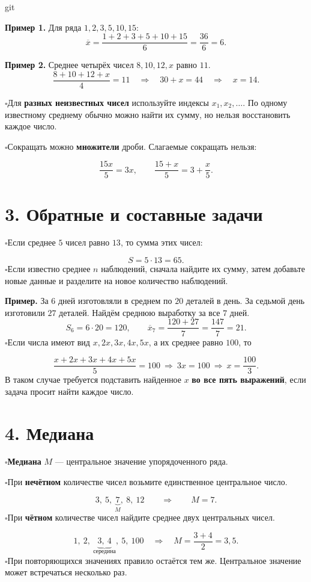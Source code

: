 git\documentclass[a4paper,12pt]{article}
\newcommand{\sectionline}{\par\vspace{-0.65em}\noindent{\color{accent!65}\rule{\linewidth}{0.45pt}}\par\vspace{0.25em}}
\newcommand{\knowledge}[1]{\noindent$\square$\enspace #1\par}
\begin{document}
\textbf{Пример 1.} Для ряда $1,2,3,5,10,15$:
\[
\overline{x}=\frac{1+2+3+5+10+15}{6}=\frac{36}{6}=6.
\]

\textbf{Пример 2.} Среднее четырёх чисел $8,10,12,x$ равно $11$.
\[
\frac{8+10+12+x}{4}=11
\quad\Longrightarrow\quad 30+x=44
\quad\Longrightarrow\quad \boxed{x=14}.
\]

\knowledge{Для \textbf{разных неизвестных чисел} используйте индексы $x_1,x_2,\ldots$. По одному известному среднему обычно можно найти их сумму, но нельзя восстановить каждое число.}
\knowledge{Сокращать можно \textbf{множители} дроби. Слагаемые сокращать нельзя:}
\[
\frac{15x}{5}=3x, \qquad \frac{15+x}{5}=3+\frac{x}{5}.
\]

\clearpage
\section*{3. Обратные и составные задачи}
\sectionline
\knowledge{Если среднее $5$ чисел равно $13$, то сумма этих чисел:}
\[
S=5\cdot13=\boxed{65}.
\]
\knowledge{Если известно среднее $n$ наблюдений, сначала найдите их сумму, затем добавьте новые данные и разделите на новое количество наблюдений.}

\textbf{Пример.} За $6$ дней изготовляли в среднем по $20$ деталей в день. За седьмой день изготовили $27$ деталей. Найдём среднюю выработку за все $7$ дней.
\[
S_6=6\cdot20=120,\qquad
\overline{x}_7=\frac{120+27}{7}=\frac{147}{7}=\boxed{21}.
\]
\knowledge{Если числа имеют вид $x,2x,3x,4x,5x$, а их среднее равно $100$, то}
\[
\frac{x+2x+3x+4x+5x}{5}=100
\ \Longrightarrow\ 3x=100
\ \Longrightarrow\ \boxed{x=\frac{100}{3}}.
\]
В таком случае требуется подставить найденное $x$ \textbf{во все пять выражений}, если задача просит найти каждое число.

\section*{4. Медиана}
\sectionline
\knowledge{\textbf{Медиана} $M$ --- центральное значение упорядоченного ряда.}
\knowledge{При \textbf{нечётном} количестве чисел возьмите единственное центральное число.}
\[
3,\ 5,\ \underbrace{7}_{M},\ 8,\ 12
\qquad\Longrightarrow\qquad \boxed{M=7}.
\]
\knowledge{При \textbf{чётном} количестве чисел найдите среднее двух центральных чисел.}
\[
1,\ 2,\ \underbrace{3,\ 4}_{\text{середина}},\ 5,\ 100
\quad\Longrightarrow\quad M=\frac{3+4}{2}=\boxed{3{,}5}.
\]
\knowledge{При повторяющихся значениях правило остаётся тем же. Центральное значение может встречаться несколько раз.}
\end{document}
